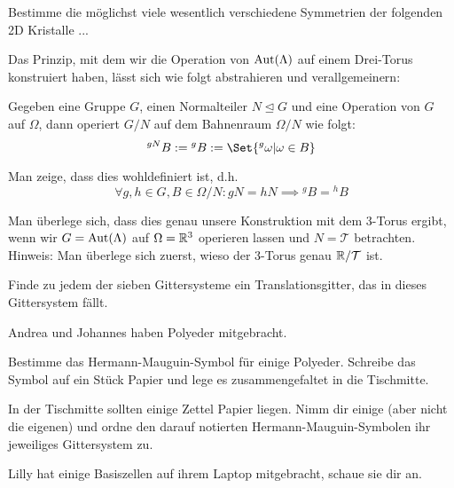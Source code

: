 \begin{sheet}

\begin{problem}
Bestimme die möglichst viele wesentlich verschiedene Symmetrien der folgenden 2D Kristalle ...
\end{problem}

\begin{problem}[difficulty={fortgeschritten}]
Das Prinzip, mit dem wir die Operation von $\operatorname{Aut}(\Lambda)$ auf einem Drei-Torus konstruiert haben, lässt sich wie folgt abstrahieren und verallgemeinern:

Gegeben eine Gruppe $G$, einen Normalteiler $N\unlhd G$ und eine Operation von $G$ auf $\Omega$, dann operiert $G/N$ auf dem Bahnenraum $\Omega/N$ wie folgt:
\[{^{gN} B} := {^g B} := \Set{{^g \omega} | \omega\in B}\]
\begin{subproblem}[difficulty={einfach}]
Man zeige, dass dies wohldefiniert ist, d.h.
\[\forall g,h\in G, B\in\Omega/N: gN=hN \implies {^g B} = {^h B}\]
\end{subproblem}
\begin{subproblem}[difficulty={mittel}]
Man überlege sich, dass dies genau unsere Konstruktion mit dem 3-Torus ergibt, wenn wir $G=\operatorname{Aut}(\Lambda)$ auf $\Omega=\mathbb{R}^3$ operieren lassen und $N=\mathcal{T}$ betrachten. Hinweis: Man überlege sich zuerst, wieso der 3-Torus genau $\mathbb{R} / \mathcal{T}$ ist.
\end{subproblem}
\end{problem}

\begin{problem}[difficulty={leicht bis mittel}]
Finde zu jedem der sieben Gittersysteme ein Translationsgitter, das in dieses Gittersystem fällt.
\end{problem}

\begin{problem}
	Andrea und Johannes haben Polyeder mitgebracht. 
	\begin{subproblem}
		Bestimme das Hermann-Mauguin-Symbol für einige Polyeder. Schreibe das Symbol auf ein Stück Papier und lege es zusammengefaltet in die Tischmitte.
	\end{subproblem}
	\begin{subproblem}
		In der Tischmitte sollten einige Zettel Papier liegen. Nimm dir einige (aber nicht die eigenen) und ordne den darauf notierten Hermann-Mauguin-Symbolen ihr jeweiliges Gittersystem zu.
	\end{subproblem}
	
\end{problem}
\begin{problem}
	Lilly hat einige Basiszellen auf ihrem Laptop mitgebracht, schaue sie dir an.
\end{problem}


\end{sheet}